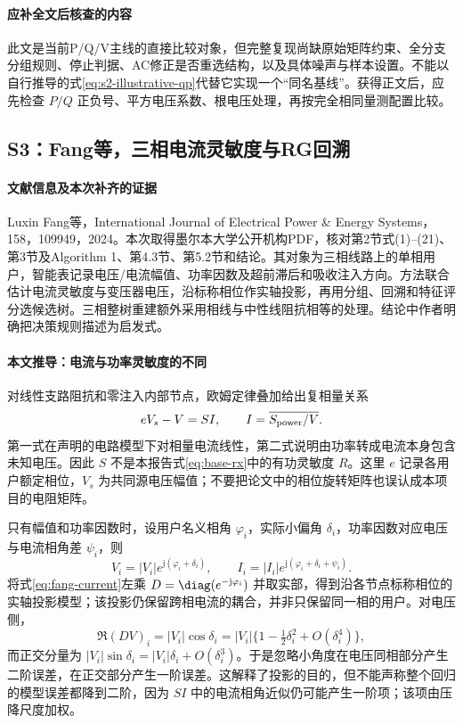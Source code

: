 \paragraph{应补全文后核查的内容}
此文是当前P/Q/V主线的直接比较对象，但完整复现尚缺原始矩阵约束、全分支分组规则、停止判据、AC修正是否重选结构，以及具体噪声与样本设置。不能以自行推导的式\eqref{eq:s2-illustrative-qp}代替它实现一个“同名基线”。获得正文后，应先检查 $P/Q$ 正负号、平方电压系数、根电压处理，再按完全相同量测配置比较。

\subsection{S3：Fang等，三相电流灵敏度与RG回溯}
\paragraph{文献信息及本次补齐的证据}
Luxin Fang等，International Journal of Electrical Power \& Energy Systems，158，109949，2024\citep{S3}。本次取得墨尔本大学公开机构PDF，核对第2节式(1)--(21)、第3节及Algorithm 1、第4.3节、第5.2节和结论。其对象为三相线路上的单相用户，智能表记录电压/电流幅值、功率因数及超前滞后和吸收注入方向。方法联合估计电流灵敏度与变压器电压，沿标称相位作实轴投影，再用分组、回溯和特征评分选候选树。三相整树重建额外采用相线与中性线阻抗相等的处理。结论中作者明确把决策规则描述为启发式。

\paragraph{本文推导：电流与功率灵敏度的不同}
对线性支路阻抗和零注入内部节点，欧姆定律叠加给出复相量关系
\begin{equation}
 eV_s-V=SI,\qquad I=\overline{S_{\rm power}/V}.
 \label{eq:fang-current}
\end{equation}
第一式在声明的电路模型下对相量电流线性，第二式说明由功率转成电流本身包含未知电压。因此 $S$ 不是本报告式\eqref{eq:base-rx}中的有功灵敏度 $R$。这里 $e$ 记录各用户额定相位，$V_s$ 为共同源电压幅值；不要把论文中的相位旋转矩阵也误认成本项目的电阻矩阵。

只有幅值和功率因数时，设用户名义相角 $\varphi_i$，实际小偏角 $\delta_i$，功率因数对应电压与电流相角差 $\psi_i$，则
\begin{equation}
 V_i=|V_i|e^{\mathrm j(\varphi_i+\delta_i)},\qquad
 I_i=|I_i|e^{\mathrm j(\varphi_i+\delta_i+\psi_i)}.
\end{equation}
将式\eqref{eq:fang-current}左乘 $D=\diag(e^{-\mathrm j\varphi_i})$ 并取实部，得到沿各节点标称相位的实轴投影模型；该投影仍保留跨相电流的耦合，并非只保留同一相的用户。对电压侧，
\begin{equation}
 \Re(DV)_i=|V_i|\cos\delta_i
 =|V_i|\{1-\tfrac12\delta_i^2+O(\delta_i^4)\},
\end{equation}
而正交分量为 $|V_i|\sin\delta_i=|V_i|\delta_i+O(\delta_i^3)$。于是忽略小角度在电压同相部分产生二阶误差，在正交部分产生一阶误差。这解释了投影的目的，但不能声称整个回归的模型误差都降到二阶，因为 $SI$ 中的电流相角近似仍可能产生一阶项；该项由压降尺度加权。

